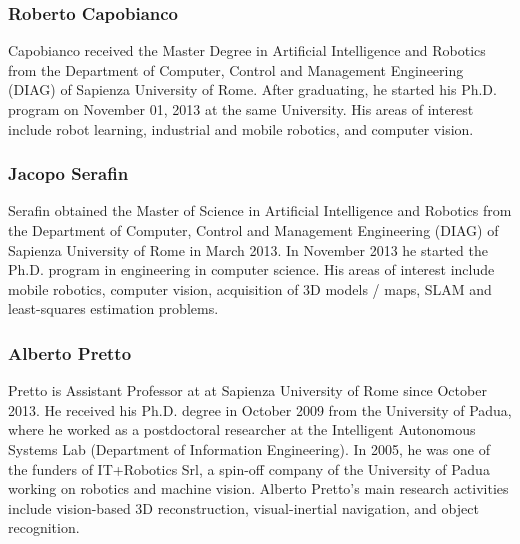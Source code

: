 \documentclass[conference]{IEEEtran}
\begin{document}
\subsubsection*{Roberto Capobianco}
Capobianco received the Master Degree in Artificial Intelligence and Robotics from the Department of Computer, 
Control and Management Engineering (DIAG) of Sapienza University of Rome. 
After graduating, he started his Ph.D. program on November 01, 2013 at the same University. His areas of interest include robot learning, industrial and mobile robotics, and computer vision.
\subsubsection*{Jacopo Serafin}
Serafin obtained the Master of Science in Artificial Intelligence and Robotics from the Department of Computer, Control and Management Engineering (DIAG) of Sapienza University of Rome in March 2013. 
In November 2013 he started the Ph.D. program in engineering in computer science. His areas of interest include mobile robotics, computer vision, acquisition of 3D models / maps, SLAM and least-squares estimation problems.
\subsubsection*{Alberto Pretto}
Pretto is Assistant Professor at at Sapienza University of Rome since October 2013. 
He received his Ph.D. degree in October 2009 from the University of Padua, where he worked as a postdoctoral researcher at the Intelligent Autonomous Systems Lab (Department of Information Engineering). 
In 2005, he was one of the funders of IT+Robotics Srl, a spin-off company of the University of Padua working on robotics and machine vision. 
Alberto Pretto's main research activities include vision-based 3D reconstruction, visual-inertial navigation, and object recognition.
\end{document}
